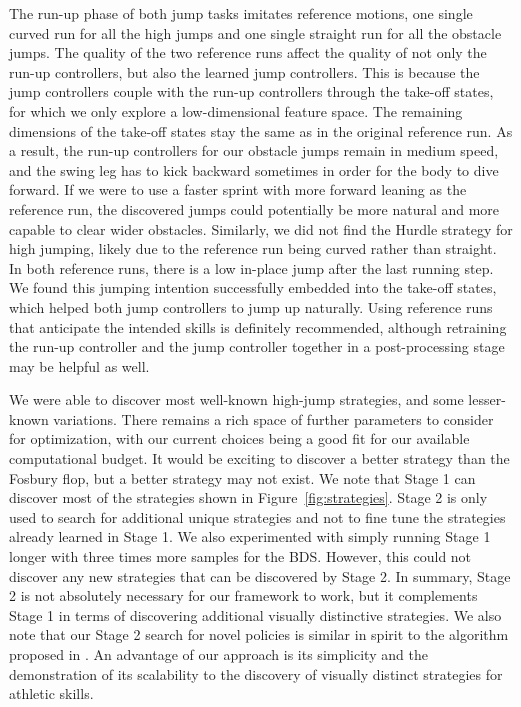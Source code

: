 The run-up phase of both jump tasks imitates reference motions, one single curved run for all the high jumps and one single straight run for all the obstacle jumps. The quality of the two reference runs affect the quality of not only the run-up controllers, but also the learned jump controllers. This is because the jump controllers couple with the run-up controllers through the take-off states, for which we only explore a low-dimensional feature space. The remaining dimensions of the take-off states stay the same as in the original reference run. As a result, the run-up controllers for our obstacle jumps remain in medium speed, and the swing leg has to kick backward sometimes in order for the body to dive forward. If we were to use a faster sprint with more forward leaning as the reference run, the discovered jumps could potentially be more natural and more capable to clear wider obstacles. Similarly, we did not find the Hurdle strategy for high jumping, likely due to the reference run being curved rather than straight. In both reference runs, there is a low in-place jump after the last running step. We found this jumping intention successfully embedded into the take-off states, which helped both jump controllers to jump up naturally. Using reference runs that anticipate the intended skills is definitely recommended, although retraining the run-up controller and the jump controller together in a post-processing stage may be helpful as well.

{We were able to discover most well-known high-jump strategies, and some lesser-known variations. There remains a rich space of further parameters to consider for optimization, with our current choices being a good fit for our available computational budget. It would be exciting to discover a better strategy than the Fosbury flop, but a better strategy may not exist. We note that Stage 1 can discover most of the strategies shown in Figure~\ref{fig:strategies}. Stage 2 is only used to search for additional unique strategies and not to fine tune the strategies already learned in Stage 1. We also experimented with simply running Stage 1 longer with three times more samples for the BDS. However, this could not discover any new strategies that can be discovered by Stage 2. In summary, Stage 2 is not absolutely necessary for our framework to work, but it complements Stage 1 in terms of discovering additional visually distinctive strategies. We also note that our Stage 2 search for novel policies is similar in spirit to the algorithm proposed in \cite{zhang2019novel-policies}. An advantage of our approach is its simplicity and the demonstration of its scalability to the discovery of visually distinct strategies for athletic skills.} 

